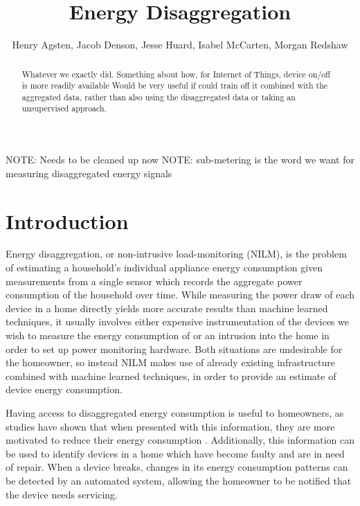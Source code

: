 \documentclass{article}
\title{Energy Disaggregation}
\author{Henry Agsten, Jacob Denson, Jesse Huard, Isabel McCarten, Morgan Redshaw}
\date{}
\begin{document}
\maketitle

\begin{abstract}
Whatever we exactly did. Something about how, for Internet of Things, device on/off is more readily available
Would be very useful if could train off it combined with the aggregated data, rather than also using the disaggregated data or taking an unsupervised approach.
\end{abstract}

NOTE: Needs to be cleaned up now
NOTE: sub-metering is the word we want for measuring disaggregated energy signals

\section{Introduction}

Energy disaggregation, or non-intrusive load-monitoring (NILM), is the problem of estimating a household's individual appliance energy consumption given measurements from a single sensor which records the aggregate power consumption of the household over time.
While measuring the power draw of each device in a home directly yields more accurate results than machine learned techniques, it usually involves either expensive instrumentation of the devices we wish to measure the energy consumption of or an intrusion into the home in order to set up power monitoring hardware.
Both situations are undesirable for the homeowner, so instead NILM makes use of already existing infrastructure combined with machine learned techniques, in order to provide an estimate of device energy consumption.

Having access to disaggregated energy consumption is useful to homeowners, as studies have shown that when presented with this information, they are more motivated to reduce their energy consumption \cite{Darby}.
Additionally, this information can be used to identify devices in a home which have become faulty and are in need of repair.
When a device breaks, changes in its energy consumption patterns can be detected by an automated system, allowing the homeowner to be notified that the device needs servicing.
\end{document}
